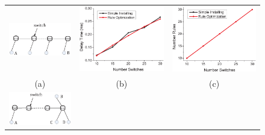 \documentclass[journal]{IEEEtran}
\begin{document}
\begin{figure} [t]
\begin{center}
\scalebox{0.9}
{
\begin{tabular}{ccc}
\includegraphics[width=0.65\columnwidth]{fig-e-31-a.eps}&
\includegraphics[width=0.65\columnwidth]{fig-e-1-24.eps}&\hspace{-0.1\columnwidth}
\includegraphics[width=0.65\columnwidth]{fig-e-2-24.eps} \\
(a) & (b) & (c)
\\
\includegraphics[width=0.65\columnwidth]{fig-e-31-d.eps}&

\end{tabular}}
\end{center}
\end{figure}
\end{document}
